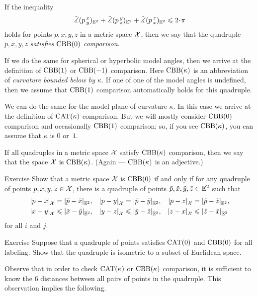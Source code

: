 If the inequality
\[\angk pxy_{\EE^2}+\angk pyz_{\EE^2}+\angk pzx_{\EE^2}\le2\cdot\pi\]
holds for points $p,x,y,z$ in a metric space $\mathcal{X}$,
then we say that 
the quadruple $p,x,y,z$ \emph{satisfies $\mathrm{CBB}(0)$ comparison}.\label{page:CBB-comparison}

If we do the same for spherical or hyperbolic model angles,
then we arrive at the definition of $\mathrm{CBB}(1)$ or $\mathrm{CBB}(-1)$ comparison.
Here $\mathrm{CBB}(\kappa)$ is an abbreviation of {}\emph{curvature bounded below by $\kappa$}.
If one of one of the model angles is undefined,
then we assume that $\mathrm{CBB}(1)$ comparison automatically holds for this quadruple.

We can do the same for the model plane of curvature $\kappa$.
In this case we arrive at the definition of $\mathrm{CAT}(\kappa)$ comparison.
But we will mostly consider  $\mathrm{CBB}(0)$ comparison and occasionally $\mathrm{CBB}(1)$ comparison;
so, if you see $\mathrm{CBB}(\kappa)$, you can assume that $\kappa$ is $0$ or~$1$.

If all quadruples in a metric space $\mathcal{X}$ satisfy $\mathrm{CBB}(\kappa)$ comparison, then we say that the space $\mathcal{X}$ is $\mathrm{CBB}(\kappa)$.
(Again --- $\mathrm{CBB}(\kappa)$ is an adjective.)

\begin{thm}{Exercise}\label{ex:(3+1)-expanding}
Show that a metric space $\mathcal{X}$ is $\mathrm{CBB}(0)$
if and only if for any quadruple of points $p,x,y,z\in \mathcal{X}$,
there is a quadruple of points $\tilde p,\tilde x,\tilde y,\tilde z\in\mathbb{E}^2$
such that 
\begin{align*}
\dist{p}{x}{\spc{X}}&=\dist{\tilde p}{\tilde x}{\EE^2},
&
\dist{p}{y}{\spc{X}}&=\dist{\tilde p}{\tilde y}{\EE^2},
&
\dist{p}{z}{\spc{X}}&=\dist{\tilde p}{\tilde z}{\EE^2},
\\
\dist{x}{y}{\spc{X}}&\le\dist{\tilde x}{\tilde y}{\EE^2},
&
\dist{y}{z}{\spc{X}}&\le\dist{\tilde y}{\tilde z}{\EE^2},
&
\dist{z}{x}{\spc{X}}&\le\dist{\tilde z}{\tilde x}{\EE^2}
\end{align*}
for all $i$ and $j$.
\end{thm}

\begin{thm}{Exercise}\label{ex:CAT+CBB}
Suppose that a quadruple of points satisfies $\mathrm{CAT}(0)$ and $\mathrm{CBB}(0)$ for all labeling.
Show that the quadruple is isometric to a subset of Euclidean space.
\end{thm}

Observe that in order to check $\mathrm{CAT}(\kappa)$ or $\mathrm{CBB}(\kappa)$ comparison, it is sufficient to know the 6 distances between all pairs of points in the quadruple.
This observation implies the following.

